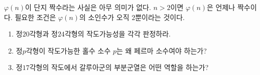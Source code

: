 \begin{pitfall}
$\varphi(n)$이 단지 짝수라는 사실은 아무 의미가 없다. $n>2$이면 $\varphi(n)$은 언제나 짝수이다. 필요한 조건은 $\varphi(n)$의 소인수가 오직 $2$뿐이라는 것이다.
\end{pitfall}

\begin{checkpoint}
\begin{enumerate}[label=(\alph*)]
  \item 정$20$각형과 정$24$각형의 작도가능성을 각각 판정하라.
  \item 정$p$각형이 작도가능한 홀수 소수 $p$는 왜 페르마 소수여야 하는가?
  \item 정$17$각형의 작도에서 갈루아군의 부분군열은 어떤 역할을 하는가?
\end{enumerate}
\end{checkpoint}
